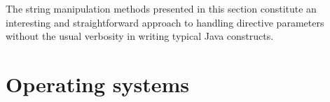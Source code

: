 The string manipulation methods presented in this section constitute an interesting and straightforward approach to handling directive parameters without the usual verbosity in writing typical Java constructs.

\section{Operating systems}
\label{sec:operatingsystems}



